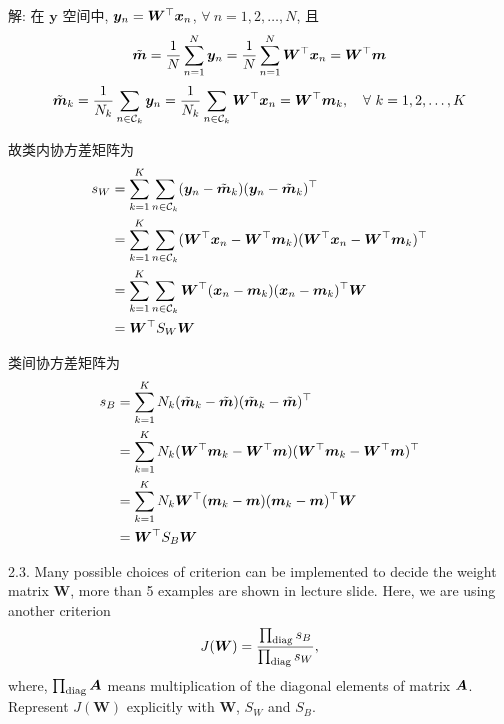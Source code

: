 \documentclass{article}
\begin{document}
解: 在 $\bm{y}$ 空间中, $\bm{y}_n=\bm{W}^{\top}\bm{x}_n$, $\forall~n=1,2,\dots,N$, 且
\begin{equation}
  \tilde{\bm{m}}
  =\frac{1}{N}\sum_{n=1}^{N}\bm{y}_{n}
  =\frac{1}{N}\sum_{n=1}^{N}\bm{W}^{\top}\bm{x}_{n}
  =\bm{W}^{\top}\bm{m}
\end{equation}
\begin{equation}
    \tilde{\bm{m}}_k
    =\frac{1}{N_{k}}\sum_{n\in \mathcal{C}_{k}}\bm{y}_{n}
    =\frac{1}{N_{k}}\sum_{n\in \mathcal{C}_{k}}\bm{W}^{\top}\bm{x}_{n}
    =\bm{W}^{\top}\bm{m}_k,\quad\forall~k=1,2,\dots,K
\end{equation}

故类内协方差矩阵为
\begin{equation}
  \begin{aligned}
    s_W
    &=\sum_{k=1}^{K}\sum_{n\in \mathcal{C}_{k}}(\bm{y}_{n}-\tilde{\bm{m}}_k)(\bm{y}_{n}-\tilde{\bm{m}}_k)^{\top}\\
    &=\sum_{k=1}^{K}\sum_{n\in \mathcal{C}_{k}}(\bm{W}^{\top}\bm{x}_{n}-\bm{W}^{\top}\bm{m}_{k})(\bm{W}^{\top}\bm{x}_{n}-\bm{W}^{\top}\bm{m}_{k})^{\top}\\
    &=\sum_{k=1}^{K}\sum_{n\in \mathcal{C}_{k}}\bm{W}^{\top}(\bm{x}_{n}-\bm{m}_{k})(\bm{x}_{n}-\bm{m}_{k})^{\top}\bm{W}\\
    &=\bm{W}^{\top}S_W\bm{W}\\
  \end{aligned}
\end{equation}

类间协方差矩阵为
\begin{equation}
  \begin{aligned}
    s_B
    &=\sum_{k=1}^{K}N_{k}(\tilde{\bm{m}}_k-\tilde{\bm{m}})(\tilde{\bm{m}}_k-\tilde{\bm{m}})^{\top}\\
    &=\sum_{k=1}^{K}N_{k}(\bm{W}^{\top}\bm{m}_{k}-\bm{W}^{\top}\bm{m})(\bm{W}^{\top}\bm{m}_{k}-\bm{W}^{\top}\bm{m})^{\top}\\
    &=\sum_{k=1}^{K}N_{k}\bm{W}^{\top}(\bm{m}_{k}-\bm{m})(\bm{m}_{k}-\bm{m})^{\top}\bm{W}\\
    &=\bm{W}^{\top}S_B\bm{W}\\
  \end{aligned}
\end{equation}

2.3. Many possible choices of criterion can be implemented to decide the weight matrix $\bm{W}$, more than 5 examples are shown in lecture slide. Here, we are using another criterion
\begin{equation}
  J(\bm{W})=\frac{\prod_{\operatorname{diag}}s_{B}}{\prod_{\operatorname{diag}}s_{W}},
  \label{eq:criterion}
\end{equation}
where, $\prod_{\operatorname{diag}}\bm{A}$ means multiplication of the diagonal elements of matrix $\bm{A}$. Represent $J(\bm{W})$ explicitly with $\bm{W}$, $S_{W}$ and $S_{B}$.
\end{document}
